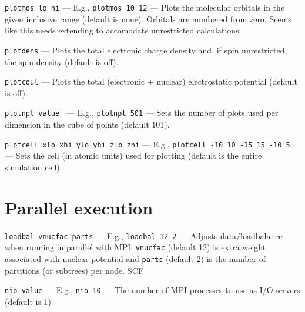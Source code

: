 \documentclass[letterpaper]{book}
\begin{document}
{\tt plotmos lo hi} --- E.g., {\tt plotmos 10 12} --- Plots the molecular orbitals in the given inclusive range (default is none).  Orbitals are numbered from zero.  Seems like this needs extending to accomodate unrestricted calculations.

{\tt plotdens} --- Plots the total electronic charge density and, if spin unrestricted, the spin density (default is off).

{\tt plotcoul} --- Plots the total (electronic + nuclear) electrostatic potential (default is off).

{\tt plotnpt value } --- E.g., {\tt plotnpt 501} --- Sets the number of plots used per dimension in the cube of points (default 101).

{\tt plotcell xlo xhi ylo yhi zlo zhi} --- E.g., {\tt plotcell -10 10 -15 15 -10 5} --- Sets the cell (in atomic units) used for plotting (default is the entire simulation cell).

\section{Parallel execution}

{\tt loadbal vnucfac parts} --- E.g., {\tt loadbal 12 2} --- Adjusts data/loadbalance when running in parallel with MPI.  {\tt vnucfac} (default 12) is extra weight associated with nuclear potential and {\tt parts} (default 2) is the number of partitions (or subtrees) per node.  SCF

{\tt nio value} --- E.g., {\tt nio 10} --- The number of MPI processes to use as I/O servers (default is 1)
\end{document}
